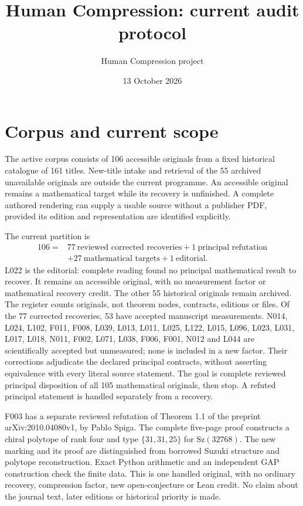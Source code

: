\documentclass[11pt,a4paper]{article}
\title{Human Compression: current audit protocol}
\author{Human Compression project}
\date{13 October 2026}
\begin{document}
\maketitle

\section{Corpus and current scope}

The active corpus consists of 106 accessible originals from a fixed historical
catalogue of 161 titles. New-title intake and retrieval of the 55 archived
unavailable originals are outside the current programme. An accessible original
remains a mathematical target while its recovery is unfinished. A complete
authored rendering can supply a usable source without a publisher PDF, provided
its edition and representation are identified explicitly.

The current partition is
\[
\begin{aligned}
106={}&77\ \text{reviewed corrected recoveries}+1\ \text{principal refutation}\\
      &+27\ \text{mathematical targets}+1\ \text{editorial}.
\end{aligned}
\]
L022 is the editorial: complete reading found no principal mathematical result
to recover. It remains an accessible original, with no measurement factor or
mathematical recovery credit. The other 55 historical originals remain archived.
The register counts originals, not theorem nodes, contracts, editions or files.
Of the 77 corrected recoveries, 53 have accepted manuscript measurements.
N014, L024, L102, F011, F008, L039, L013, L011, L025, L122, L015, L096, L023, L031, L017, L018, N011, F002, L071, L038, F006, F001, N012 and L044 are scientifically accepted but unmeasured; none is included
in a new factor. Their corrections adjudicate the declared principal contracts,
without asserting equivalence with every literal source statement. The goal
is complete reviewed principal disposition of all 105 mathematical originals,
then stop. A refuted principal statement is handled separately from a recovery.

F003 has a separate reviewed refutation of Theorem 1.1 of the preprint
arXiv:2010.04080v1, by Pablo Spiga. The complete five-page proof constructs a
chiral polytope of rank four and type $\{31,31,25\}$ for $\mathrm{Sz}(32768)$.
The new marking and its proof are distinguished from borrowed Suzuki structure
and polytope reconstruction. Exact Python arithmetic and an independent GAP
construction check the finite data. This is one handled original, with no
ordinary recovery, compression factor, new open-conjecture or Lean credit.
No claim about the journal text, later editions or historical priority is made.
\end{document}
